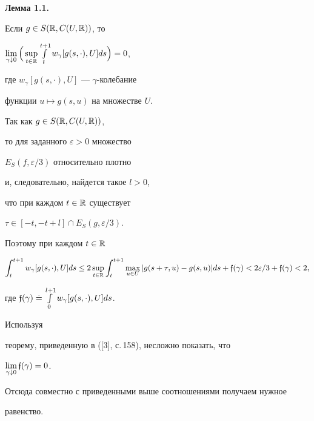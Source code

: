 {\bf Лемма 1.1.} {\it


Если $g\in S(\Bbb R,C(U,\Bbb R))$, то


$\lim\limits_{\gamma\downarrow 0}


\Big(\sup\limits_{t\in\Bbb R}\int\limits_{t}^{t+1}


w_{\gamma}[g(s,\cdot),U] ds\Big)=0$,


где $w_{\gamma}[g(s,\cdot),U]$ --- $\gamma$-колебание


функции $u\mapsto g(s,u)$ на множестве $U$.


}





\begin{pf}


Так как $g\in S(\Bbb R,C(U,\Bbb R))$,


то для заданного $\varepsilon>0$ множество


$E_{S}(f,\varepsilon/3)$ относительно плотно


и, следовательно, найдется такое $l>0$,


что при каждом $t\in\Bbb R$ существует


$\tau\in [-t,-t+l]\cap E_{S}(g,\varepsilon/3)$.


Поэтому при каждом $t\in\Bbb R$


$$


\int_{t}^{t+1}w_{\gamma}[g(s,\cdot),U] ds\le


2\sup\limits_{t\in\Bbb R}


\int_{t}^{t+1}\max\limits_{u\in U}|g(s+\tau,u)-g(s,u)|ds


+\gf(\gamma)<2\varepsilon/3+\gf(\gamma)<2,


$$


где $\frak f(\gamma)\doteq\int\limits_{0}^{l+1}w_{\gamma}[g(s,\cdot),U] ds$.


Используя


теорему, приведенную в ([3], с.\,158), несложно показать, что


$\lim\limits_{\gamma\downarrow 0}\frak f(\gamma)=0$.


Отсюда совместно с приведенными выше соотношениями получаем нужное


равенство.


\end{pf}





